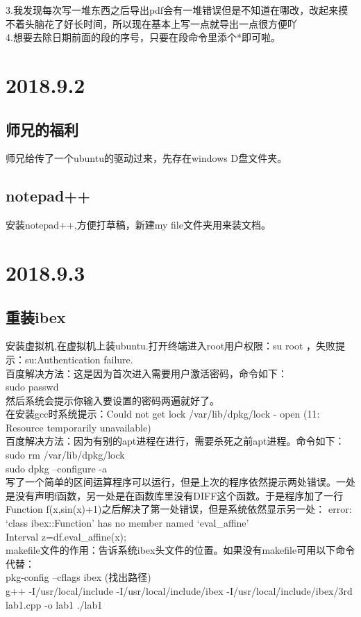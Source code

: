 \documentclass[UTF8]{ctexart}
\begin{document}
3.我发现每次写一堆东西之后导出pdf会有一堆错误但是不知道在哪改，改起来摸不着头脑花了好长时间，所以现在基本上写一点就导出一点很方便吖\\

4.想要去除日期前面的段的序号，只要在段命令里添个*即可啦。
\section{2018.9.2}
\subsection{师兄的福利}
师兄给传了一个ubuntu的驱动过来，先存在windows D盘文件夹。
\subsection{notepad++}
安装notepad++,方便打草稿，新建my file文件夹用来装文档。
\section{2018.9.3}
\subsection{重装ibex}
安装虚拟机,在虚拟机上装ubuntu.打开终端进入root用户权限：su root ，失败提示：su:Authentication failure.\\
百度解决方法：这是因为首次进入需要用户激活密码，命令如下：\\
sudo passwd\\
然后系统会提示你输入要设置的密码两遍就好了。\\

在安装gcc时系统提示：Could not get lock /var/lib/dpkg/lock - open (11: Resource temporarily unavailable)\\
百度解决方法：因为有别的apt进程在进行，需要杀死之前apt进程。命令如下：\\
sudo rm /var/lib/dpkg/lock\\
sudo dpkg --configure -a\\

写了一个简单的区间运算程序可以运行，但是上次的程序依然提示两处错误。一处是没有声明f函数，另一处是在函数库里没有DIFF这个函数。于是程序加了一行Function f(x,sin(x)+1)之后解决了第一处错误，但是系统依然显示另一处： error: ‘class ibex::Function’ has no member named ‘eval_affine’\\
 Interval z=df.eval_affine(x); \\
 
makefile文件的作用：告诉系统ibex头文件的位置。如果没有makefile可用以下命令代替：\\
pkg-config --cflags ibex    (找出路径)\\
g++ -I/usr/local/include -I/usr/local/include/ibex -I/usr/local/include/ibex/3rd lab1.cpp -o lab1
./lab1\\
\end{document}
